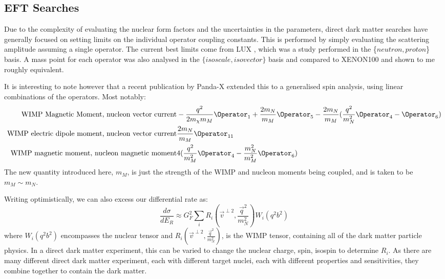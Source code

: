 \subsection{EFT Searches}
\par
Due to the complexity of evaluating the nuclear form factors and the uncertainties in the parameters, direct dark matter searches have generally focused on setting limits on the individual operator coupling constants.
This is performed by simply evaluating the scattering amplitude assuming a single operator.
The current best limits come from LUX \cite{LUX_RUN4_EFT_2021}, which was a study performed in the \{$neutron,proton$\} basis.
A mass point for each operator was also analysed in the $\{isoscale, isovector\}$ basis and compared to XENON100 \cite{xenon100_eft_ref} and shown to me roughly equivalent.

\par
It is interesting to note however that a recent publication by Panda-X extended this to a generalised spin analysis, using linear combinations of the operators.
Most notably:
\begin{equation}
\begin{split}
    \text{WIMP Magnetic Moment, nucleon vector current} & -\frac{q^2}{2m_\chi m_M}\Operator_1 + \frac{2m_N}{m_M}\Operator_5 - \frac{2m_N}{m_M}(\frac{q^2}{m_N^2}\Operator_4 - \Operator_6) \\
    \text{WIMP electric dipole moment, nucleon vector current} & \frac{2m_N}{m_M}\Operator_{11} \\
    \text{WIMP magnetic moment, nucleon magnetic moment} & 4(\frac{q^2}{m_M^2}\Operator_4 - \frac{m_N^2}{m_M^2}\Operator_6)
\end{split}
\end{equation}
The new quantity introduced here, $m_M$, is just the strength of the WIMP and nucleon moments being coupled, and is taken to be $m_M \sim m_N$.

\par
Writing optimistically, we can also excess our differential rate as:
\begin{equation}
    \frac{d\sigma}{dE_R} \approx G_F^2 \sum_{i} R_i (\vec{v}^{\perp 2}, \frac{\vec{q}^2}{m_N^2}) W_i(q^2b^2)
\end{equation}
where $W_i(q^2b^2)$ encompasses the nuclear tensor and $R_i (\vec{v}^{\perp 2}, \frac{\vec{q}^2}{m_N^2})$, is the WIMP tensor, containing all of the dark matter particle physics.
In a direct dark matter experiment, this can be varied to change the nuclear charge, spin, isospin to determine $R_i$.
As there are many different direct dark matter experiment, each with different target nuclei, each with different properties and sensitivities, they combine together to contain the dark matter.